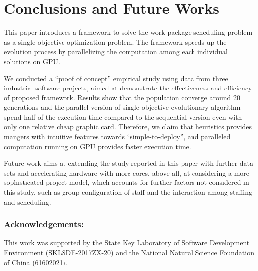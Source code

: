%
%

\section{Conclusions and Future Works}
%
This paper introduces a framework to solve the work package scheduling problem as a single objective optimization problem. The framework speeds up the evolution process by parallelizing the computation among each individual solutions on GPU. 

We conducted a ``proof of concept'' empirical study using data from three industrial software projects, aimed at demonstrate the effectiveness and efficiency of proposed framework.
Results show that the population converge around 20 generations and the parallel version of single objective evolutionary algorithm spend half of the execution time compared to the sequential version even with only one relative cheap graphic card. 
Therefore, we claim that heuristics provides mangers with intuitive features towards ``simple-to-deploy'', and paralleled computation running on GPU provides faster execution time.

Future work aims at extending the study reported in this paper with further data sets and accelerating hardware with more cores, above all, at considering a more sophisticated project model, which accounts for further factors not considered in this study, such as group configuration of staff and the interaction among staffing and scheduling.

\subsubsection{\small{Acknowledgements:}} \small{This work was supported by the State Key Laboratory of Software Development Environment (SKLSDE-2017ZX-20) and the National Natural Science Foundation of China (61602021).}

